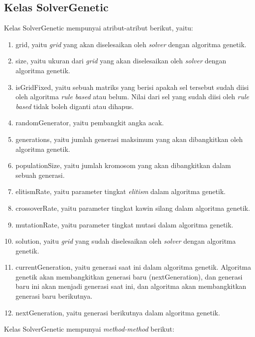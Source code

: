 \subsection{Kelas SolverGenetic}
\label{sec:kelassolvergenetic}

Kelas SolverGenetic mempunyai atribut-atribut berikut, yaitu:

\begin{enumerate}
\item grid, yaitu \textit{grid} yang akan diselesaikan oleh \textit{solver} dengan algoritma genetik.
\item size, yaitu ukuran dari \textit{grid} yang akan diselesaikan oleh \textit{solver} dengan algoritma genetik.
\item isGridFixed, yaitu sebuah matriks yang berisi apakah sel tersebut sudah diisi oleh algoritma \textit{rule based} atau belum. Nilai dari sel yang sudah diisi oleh \textit{rule based} tidak boleh diganti atau dihapus.
\item randomGenerator, yaitu pembangkit angka acak.
\item generations, yaitu jumlah generasi maksimum yang akan dibangkitkan oleh algoritma genetik.
\item populationSize, yaitu jumlah kromosom yang akan dibangkitkan dalam sebuah generasi.
\item elitismRate, yaitu parameter tingkat \textit{elitism} dalam algoritma genetik.
\item crossoverRate, yaitu parameter tingkat kawin silang dalam algoritma genetik.
\item mutationRate, yaitu parameter tingkat mutasi dalam algoritma genetik.
\item solution, yaitu \textit{grid} yang sudah diselesaikan oleh \textit{solver} dengan algoritma genetik.
\item currentGeneration, yaitu generasi saat ini dalam algoritma genetik. Algoritma genetik akan membangkitkan generasi baru (nextGeneration), dan generasi baru ini akan menjadi generasi saat ini, dan algoritma akan membangkitkan generasi baru berikutnya.
\item nextGeneration, yaitu generasi berikutnya dalam algoritma genetik.
\end{enumerate}

Kelas SolverGenetic mempunyai \textit{method-method} berikut:

